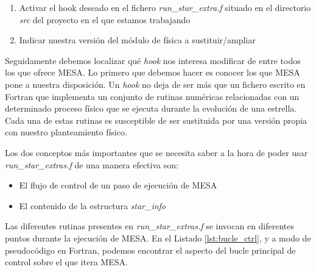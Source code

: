 \begin{enumerate}
    \item Activar el hook deseado en el fichero \textit{run\_star\_extra.f} situado en el directorio \textit{src} del proyecto en el que estamos trabajando
    \item Indicar nuestra versión del módulo de física a sustituir/ampliar
\end{enumerate}

Seguidamente debemos localizar qué \textit{hook} nos interesa modificar de entre todos los que ofrece MESA. Lo primero que debemos hacer es conocer los que MESA pone a nuestra disposición. Un \textit{hook} no deja de ser más que un fichero escrito en Fortran que implementa un conjunto de rutinas numéricas relacionadas con un determinado proceso físico que se ejecuta durante la evolución de una estrella. Cada una de estas rutinas es susceptible de ser sustituida por una versión propia con nuestro planteamiento físico.\par

Los dos conceptos más importantes que se necesita saber a la hora de poder usar \textit{run\_star\_extras.f} de una manera efectiva son:
\begin{itemize}
    \item El flujo de control de un paso de ejecución de MESA
    \item El contenido de la estructura \textit{star\_info}
\end{itemize}

Las diferentes rutinas presentes en \textit{run\_star\_extras.f} se invocan en diferentes puntos durante la ejecución de MESA. En el Listado \ref{lst:bucle_ctrl}, y a modo de pseudo\-código en Fortran, podemos encontrar el aspecto del bucle principal de control sobre el que itera MESA.\par

